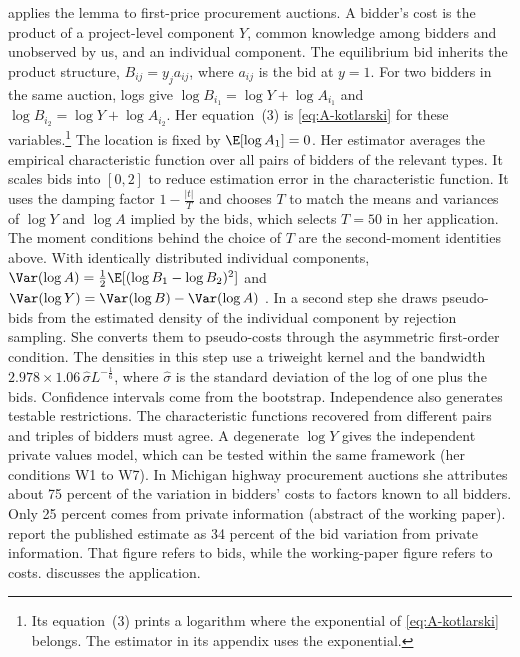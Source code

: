 \citet{Krasnokutskaya2011} applies the lemma to first-price procurement auctions. A bidder's cost is
the product of a project-level component $Y$, common knowledge among bidders and unobserved by us, and an
individual component. The equilibrium bid inherits the product structure, $B_{ij}=y_ja_{ij}$, where
$a_{ij}$ is the bid at $y=1$. For two bidders in the same auction, logs give
$\log B_{i_1}=\log Y+\log A_{i_1}$ and $\log B_{i_2}=\log Y+\log A_{i_2}$. Her equation~(3) is
\eqref{eq:A-kotlarski} for these variables.\footnote{Its equation~(3) prints a logarithm where the
exponential of \eqref{eq:A-kotlarski} belongs. The estimator in its appendix uses the exponential.} The
location is fixed by $\E[\log A_1]=0$. Her estimator averages the empirical characteristic function over
all pairs of bidders of the relevant types. It scales bids into $[0,2]$ to reduce estimation error in the
characteristic function. It uses the damping factor $1-\frac{|t|}{T}$ and chooses $T$ to match the means
and variances of $\log Y$ and $\log A$ implied by the bids, which selects $T=50$ in her application. The
moment conditions behind the choice of $T$ are the second-moment identities above. With identically
distributed individual components, $\Var(\log A)=\frac{1}{2}\E[(\log B_1-\log B_2)^2]$ and
$\Var(\log Y)=\Var(\log B)-\Var(\log A)$ \citep[Section~4.3]{Krasnokutskaya2011}. In a second step she
draws pseudo-bids from the estimated density of the individual component by rejection sampling. She
converts them to pseudo-costs through the asymmetric first-order condition. The densities in this step
use a triweight kernel and the bandwidth $2.978\times1.06\,\hat\sigma L^{-\frac{1}{6}}$, where
$\hat\sigma$ is the standard deviation of the log of one plus the bids. Confidence intervals come from
the bootstrap. Independence also generates testable restrictions. The characteristic functions
recovered from different pairs and triples of bidders must agree. A degenerate $\log Y$ gives the
independent private values model, which can be tested within the same framework (her conditions W1 to
W7). In Michigan highway procurement auctions she attributes about 75 percent of the variation in
bidders' costs to factors known to all bidders. Only 25 percent comes from private information
(abstract of the working paper). \citet[p.~103]{HortacsuPerrigne2021} report the published estimate as 34 percent
of the bid variation from private information. That figure refers to bids, while the working-paper figure refers to
costs.  discusses the application.

